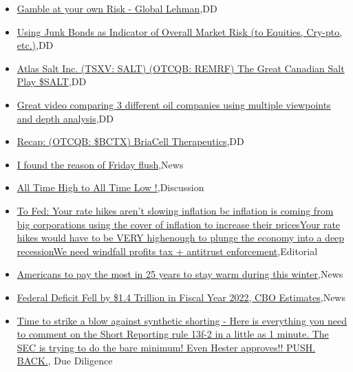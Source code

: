 \documentclass{article}%
\begin{document}
%
\begin{itemize}%
\item%
\href{https://reddit.com/r/wallstreetbets/comments/y4mzgx/gamble\_at\_your\_own\_risk\_global\_lehman/}{Gamble at your own Risk - Global Lehman},DD%
\item%
\href{https://reddit.com/r/wallstreetbets/comments/y4mhxl/using\_junk\_bonds\_as\_indicator\_of\_overall\_market/}{Using Junk Bonds as Indicator of Overall Market Risk (to Equities, Cry-pto, etc.)},DD%
\item%
\href{https://reddit.com/r/Baystreetbets/comments/y41jc7/atlas\_salt\_inc\_tsxv\_salt\_otcqb\_remrf\_the\_great/}{Atlas Salt Inc. (TSXV: SALT) (OTCQB: REMRF) The Great Canadian Salt Play \$SALT},DD%
\item%
\href{https://reddit.com/r/Baystreetbets/comments/y410rz/great\_video\_comparing\_3\_different\_oil\_companies/}{Great video comparing 3 different oil companies using multiple viewpoints and depth analysis},DD%
\item%
\href{https://reddit.com/r/Baystreetbets/comments/y3ztxl/recap\_otcqb\_bctx\_briacell\_therapeutics/}{Recap: (OTCQB: \$BCTX) BriaCell Therapeutics},DD%
\item%
\href{https://reddit.com/r/StockMarket/comments/y4j9vt/i\_found\_the\_reason\_of\_friday\_flush/}{I found the reason of Friday flush},News%
\item%
\href{https://reddit.com/r/StockMarket/comments/y4fmbq/all\_time\_high\_to\_all\_time\_low/}{All Time High to All Time Low !},Discussion%
\item%
\href{https://reddit.com/r/Economics/comments/y4kaw5/to\_fed\_your\_rate\_hikes\_arent\_slowing\_inflation\_bc/}{To Fed: Your rate hikes aren't slowing inflation bc inflation is coming from big corporations using the cover of inflation to increase their pricesYour rate hikes would have to be VERY highenough to plunge the economy into a deep recessionWe need windfall profits tax + antitrust enforcement},Editorial%
\item%
\href{https://reddit.com/r/Economics/comments/y4hbye/americans\_to\_pay\_the\_most\_in\_25\_years\_to\_stay/}{Americans to pay the most in 25 years to stay warm during this winter},News%
\item%
\href{https://reddit.com/r/Economics/comments/y4fz8r/federal\_deficit\_fell\_by\_14\_trillion\_in\_fiscal/}{Federal Deficit Fell by \$1.4 Trillion in Fiscal Year 2022, CBO Estimates},News%
\item%
\href{https://reddit.com/r/Superstonk/comments/y4m63e/time\_to\_strike\_a\_blow\_against\_synthetic\_shorting/}{ Time to strike a blow against synthetic shorting - Here is everything you need to comment on the Short Reporting rule 13f-2 in a little as 1 minute. The SEC is trying to do the bare minimum! Even Hester approves!! PUSH. BACK.}, Due Diligence%
\end{itemize}%
\end{document}
